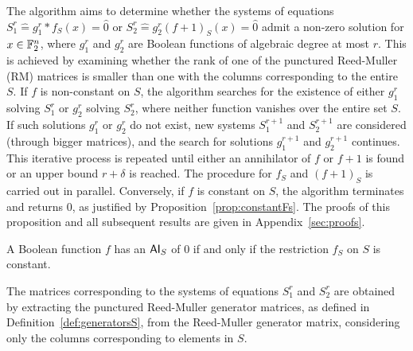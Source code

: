 \documentclass[11pt]{llncs}
\begin{document}
The algorithm aims to determine whether the systems of equations $S_1^r \hat{=}g_1^r*f_S (x)= \hat{0}$ or $S_2^r\hat{=}g_2^r (f+ 1)_S (x) = \hat{0}$ admit a non-zero solution for $x \in \mathbb{F}_2^n$, where $g_1^r$ and $ g_2^r$ are Boolean functions of algebraic degree at most $ r$. 
This is achieved by examining whether the rank of one of the punctured Reed-Muller (RM) matrices is smaller than one with the columns corresponding to the entire $S$.
If $f$ is non-constant on $S$, the algorithm searches for the existence of either $g_1^r$ solving $S_1^r$ or $g_2^r$ solving $S_2^r$, where neither function vanishes over the entire set \( S \). 
If such solutions \( g_1^r \) or \( g_2^r \) do not exist, new systems \( S_1^{r+1} \) and \( S_2^{r+1} \) are considered (through bigger matrices), and the search for solutions \( g_1^{r+1} \) and \( g_2^{r+1} \) continues. This iterative process is repeated until either an annihilator of \( f \) or \( f + 1 \) is found or an upper bound \( r + \delta \) is reached. The procedure for \( f_S \) and \( (f + 1)_S \) is carried out in parallel.
Conversely, if \( f \) is constant on \( S \), the algorithm terminates and returns \( 0 \), as justified by Proposition~\ref{prop:constantFs}. 
The proofs of this proposition and all subsequent results are given in Appendix~\ref{sec:proofs}.



\begin{proposition}\label{prop:constantFs}
	A Boolean function $f$ has an $\mathsf{AI}_S$ of $0$ if and only if the restriction $f_S$ on $S$ is constant.
\end{proposition}

The matrices corresponding to the systems of equations $S_1^r$ and $S_2^r$ are obtained by extracting the punctured Reed-Muller generator matrices, as defined in Definition~\ref{def:generatorsS}, from the Reed-Muller generator matrix, considering only the columns corresponding to elements in $S$.

\end{document}
